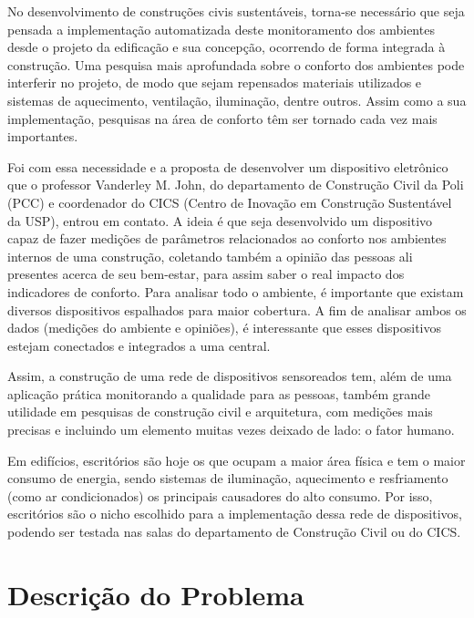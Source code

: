 \documentclass[]{politex}
\begin{document}
No desenvolvimento de construções civis sustentáveis, torna-se necessário que seja pensada a implementação automatizada deste monitoramento dos ambientes desde o projeto da edificação e sua concepção, ocorrendo de forma integrada à construção. Uma pesquisa mais aprofundada sobre o conforto dos ambientes pode interferir no projeto, de modo que sejam repensados materiais utilizados e sistemas de aquecimento, ventilação, iluminação, dentre outros. Assim como a sua implementação, pesquisas na área de conforto têm ser tornado cada vez mais importantes. 

Foi com essa necessidade e a proposta de desenvolver um dispositivo eletrônico que o professor Vanderley M. John, do departamento de Construção Civil da Poli (PCC) e coordenador do CICS (Centro de Inovação em Construção Sustentável da USP)\cite{CICS}, entrou em contato. A ideia é que seja desenvolvido um dispositivo capaz de fazer medições de parâmetros relacionados ao conforto nos ambientes internos de uma construção, coletando também a opinião das pessoas ali presentes acerca de seu bem-estar, para assim saber o real impacto dos indicadores de conforto. Para analisar todo o ambiente, é importante que existam diversos dispositivos espalhados para maior cobertura. A fim de analisar ambos os dados (medições do ambiente e opiniões), é interessante que esses dispositivos estejam conectados e integrados a uma central. 

Assim, a construção de uma rede de dispositivos sensoreados tem, além de uma aplicação prática monitorando a qualidade para as pessoas, também grande utilidade em pesquisas de construção civil e arquitetura, com medições mais precisas e incluindo um elemento muitas vezes deixado de lado: o fator humano.

Em edifícios, escritórios são hoje os que ocupam a maior área física e tem o maior consumo de energia, sendo sistemas de iluminação, aquecimento e resfriamento (como ar condicionados) os principais causadores do alto consumo\cite{EnergyBuildings}. Por isso, escritórios são o nicho escolhido para a implementação dessa rede de dispositivos, podendo ser testada nas salas do departamento de Construção Civil ou do CICS. 



\section{Descrição do Problema} %
\end{document}
